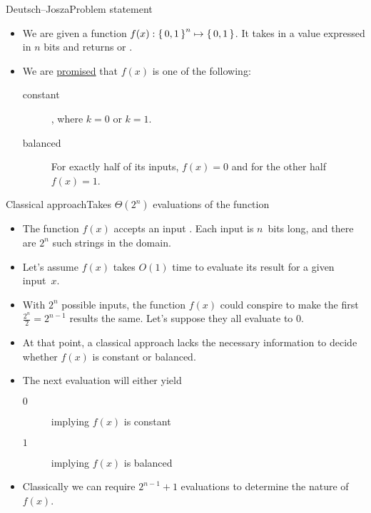 \begin{frame}{Deutsch--Josza}{Problem statement}
\begin{itemize}[<+->]
    \item We are given a function $f(x): \left\{\,0,1\,\right\}^{n}\mapsto \left\{\,0,1\,\right\}$.  It takes in a value expressed in $n$ bits and returns \True{} or \False{}.
    \item We are \href{https://en.wikipedia.org/wiki/Promise_problem}{promised} that $f(x)$ is one of the following:
    \begin{description}
        \item[constant]  , where $k=0$ or $k=1$.
        \item[balanced]  For exactly half of its inputs, $f(x) = 0$ and for the other half $f(x) = 1$.
    \end{description}
\end{itemize}
\end{frame}

\begin{frame}{Classical approach}{Takes $\Theta(2^{n})$ evaluations of the function}

\begin{itemize}[<+->]
    \item The function $f(x)$ accepts an input .  Each input is $n$~bits long, and there are $2^n$ such strings in the domain.
    \item Let's assume $f(x)$ takes $O(1)$ time
    to evaluate its result for a given input~$x$.
    \item With $2^{n}$ possible inputs, the function $f(x)$ could conspire to make the first $\frac{2^n}{2}=2^{n-1}$ results the same.  Let's suppose they all evaluate to $0$.
    \item At that point, a classical approach lacks the necessary information to decide whether $f(x)$ is constant or balanced.
    \item The next evaluation will either yield
    \begin{description}
      \item[$0$] implying $f(x)$ is constant
      \item[$1$] implying $f(x)$ is balanced
    \end{description}
    \item Classically we can require $2^{n-1}+1$ evaluations to determine the nature of $f(x)$.
\end{itemize}
    
\end{frame}

